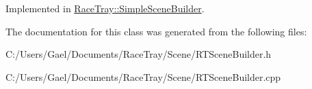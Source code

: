 Implemented in \hyperlink{class_race_tray_1_1_simple_scene_builder_ae4a08c2dae004e17f95a30cbf8249c8b}{Race\-Tray\-::\-Simple\-Scene\-Builder}.



The documentation for this class was generated from the following files\-:\begin{DoxyCompactItemize}
\item 
C\-:/\-Users/\-Gael/\-Documents/\-Race\-Tray/\-Scene/R\-T\-Scene\-Builder.\-h\item 
C\-:/\-Users/\-Gael/\-Documents/\-Race\-Tray/\-Scene/R\-T\-Scene\-Builder.\-cpp\end{DoxyCompactItemize}
